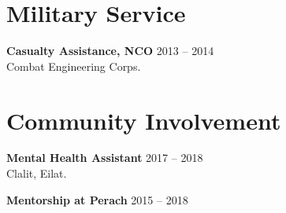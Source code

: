 \documentclass[
	12pt,a4paper %
]{article}
\begin{document}
\begin{paracol}{2}
\section{Military Service}
\textbf{Casualty Assistance, NCO} \hfill 2013 -- 2014 \\
Combat Engineering Corps.

 \section{Community Involvement}

 \textbf{Mental Health Assistant} \hfill 2017 -- 2018 \\
 Clalit, Eilat.

 \textbf{Mentorship at Perach} \hfill 2015 -- 2018
\end{paracol} %
\end{document}

